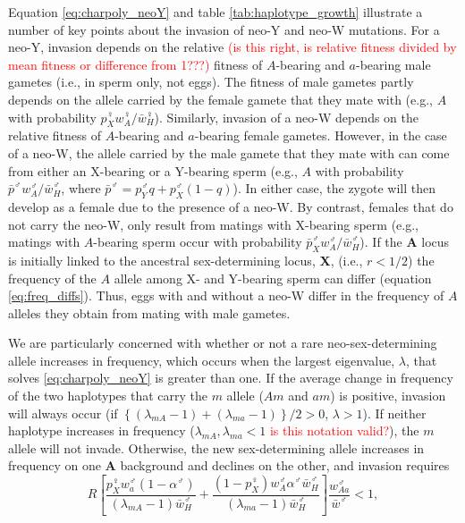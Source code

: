 \documentclass[12pt]{article}
\begin{document}
Equation \eqref{eq:charpoly_neoY} and table \ref{tab:haplotype_growth} illustrate a number of key points about the invasion of neo-Y and neo-W mutations. 
For a neo-Y, invasion depends on the relative \textcolor{red}{(is this right, is relative fitness divided by mean fitness or difference from 1???)} fitness of $A$-bearing and $a$-bearing male gametes (i.e., in sperm only, not eggs). 
The fitness of male gametes partly depends on the allele carried by the female gamete that they mate with (e.g., $A$ with probability $p_{X}^{\female} w_{A}^{\female}/\bar{w}_{H}^{\female}$).
Similarly, invasion of a neo-W depends on the relative fitness of $A$-bearing and $a$-bearing female gametes. 
However, in the case of a neo-W, the allele carried by the male gamete that they mate with can come from either an X-bearing or a Y-bearing sperm (e.g., $A$ with probability $\bar{p}^{\male} w_{A}^{\male}/\bar{w}_{H}^{\male}$, where $\bar{p}^{\male}=p_{Y}^{\male}q+p_{X}^{\male}(1-q)$). In either case, the zygote will then develop as a female due to the presence of a neo-W. 
By contrast, females that do not carry the neo-W, only result from matings with X-bearing sperm (e.g., matings with $A$-bearing sperm occur with probability $\bar{p}_{X}^{\male} w_{A}^{\male}/\bar{w}_{H}^{\male}$). 
If the \textbf{A} locus is initially linked to the ancestral sex-determining locus, \textbf{X}, (i.e., $r<1/2$) the frequency of the $A$ allele among X- and Y-bearing sperm can differ (equation \ref{eq:freq_diffs}). 
Thus, eggs with and without a neo-W differ in the frequency of $A$ alleles they obtain from mating with male gametes. 

We are particularly concerned with whether or not a rare neo-sex-determining allele increases in frequency, which occurs when the largest eigenvalue, $\lambda$, that solves \eqref{eq:charpoly_neoY} is greater than one. 
If the average change in frequency of the two haplotypes that carry the $m$ allele ($Am$ and $am$) is positive, invasion will always occur (if $\left\{(\lambda_{mA}-1)+ (\lambda_{ma}-1) \right\}/2>0$, $\lambda>1$). 
If neither haplotype increases in frequency ($\lambda_{mA}, \lambda_{ma} < 1$ \textcolor{red}{is this notation valid?}), the $m$ allele will not invade. 
Otherwise, the new sex-determining allele increases in frequency on one \textbf{A} background and declines on the other, and invasion requires
\begin{equation}\label{eq:neoYR}
R \left[ 
\frac{p^\female_X w^\male_a (1-\alpha^\male)}{(\lambda_{mA}-1)\bar{w}_{H}^{\male}} + 
\frac{(1 - p^\female_X) w^\male_A \alpha^\male \bar{w}_{H}^{\male}}{(\lambda_{ma}-1)\bar{w}_{H}^{\male}} \right] 
\frac{w^\male_{Aa}}{\bar{w}^\male} < 1,
\end{equation}
\end{document}
